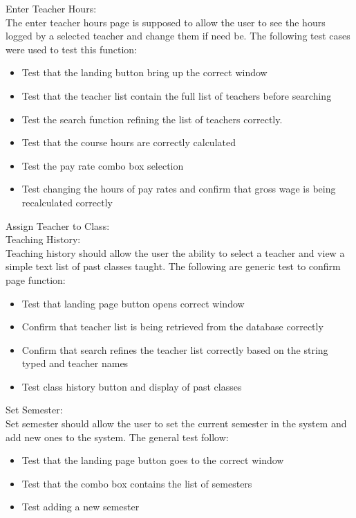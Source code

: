 Enter Teacher Hours:\\
The enter teacher hours page is supposed to allow the user to see the hours logged by a selected teacher and change them if need be. The following test cases were used to test this function:

\begin{itemize}
\item Test that the landing button bring up the correct window
\item Test that the teacher list contain the full list of teachers before searching
\item Test the search function refining the list of teachers correctly.
\item Test that the course hours are correctly calculated
\item Test the pay rate combo box selection
\item Test changing the hours of pay rates and confirm that gross wage is being recalculated correctly
\end{itemize} 

Assign Teacher to Class:\\

Teaching History:\\
Teaching history should allow the user the ability to select a teacher and view a simple text list of past classes taught. The following are generic test to confirm page function:

\begin{itemize}
\item Test that landing page button opens correct window
\item Confirm that teacher list is being retrieved from the database correctly
\item Confirm that search refines the teacher list correctly based on the string typed and teacher names
\item Test class history button and display of past classes
\end{itemize}

Set Semester:\\
Set semester should allow the user to set the current semester in the system and add new ones to the system. The general test follow:

\begin{itemize}
\item Test that the landing page button goes to the correct window
\item Test that the combo box contains the list of semesters
\item Test adding a new semester
\end{itemize}

